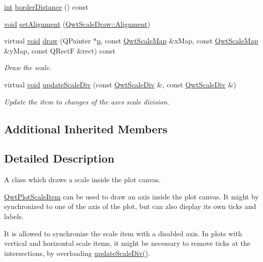 \begin{DoxyCompactItemize}
\hyperlink{ioapi_8h_a787fa3cf048117ba7123753c1e74fcd6}{int} \hyperlink{class_qwt_plot_scale_item_a3200035a9dd88e07f154ef4289a952c2}{border\-Distance} () const 
\item 
\hyperlink{group___u_a_v_objects_plugin_ga444cf2ff3f0ecbe028adce838d373f5c}{void} \hyperlink{class_qwt_plot_scale_item_af11343d14c4ee38e0527cedd52b3da85}{set\-Alignment} (\hyperlink{class_qwt_scale_draw_acd7ceeeac592ef08530788580b461c66}{Qwt\-Scale\-Draw\-::\-Alignment})
\item 
virtual \hyperlink{group___u_a_v_objects_plugin_ga444cf2ff3f0ecbe028adce838d373f5c}{void} \hyperlink{class_qwt_plot_scale_item_a2eef74cfd6007faf8b6e146277c82661}{draw} (Q\-Painter $\ast$\hyperlink{glext_8h_aa5367c14d90f462230c2611b81b41d23}{p}, const \hyperlink{class_qwt_scale_map}{Qwt\-Scale\-Map} \&x\-Map, const \hyperlink{class_qwt_scale_map}{Qwt\-Scale\-Map} \&y\-Map, const Q\-Rect\-F \&rect) const 
\begin{DoxyCompactList}\small\item\em Draw the scale. \end{DoxyCompactList}\item 
virtual \hyperlink{group___u_a_v_objects_plugin_ga444cf2ff3f0ecbe028adce838d373f5c}{void} \hyperlink{class_qwt_plot_scale_item_a9c32bac1ff73c6527305698792a6edfe}{update\-Scale\-Div} (const \hyperlink{class_qwt_scale_div}{Qwt\-Scale\-Div} \&, const \hyperlink{class_qwt_scale_div}{Qwt\-Scale\-Div} \&)
\begin{DoxyCompactList}\small\item\em Update the item to changes of the axes scale division. \end{DoxyCompactList}\end{DoxyCompactItemize}
\subsection*{Additional Inherited Members}


\subsection{Detailed Description}
A class which draws a scale inside the plot canvas. 

\hyperlink{class_qwt_plot_scale_item}{Qwt\-Plot\-Scale\-Item} can be used to draw an axis inside the plot canvas. It might by synchronized to one of the axis of the plot, but can also display its own ticks and labels.

It is allowed to synchronize the scale item with a disabled axis. In plots with vertical and horizontal scale items, it might be necessary to remove ticks at the intersections, by overloading \hyperlink{class_qwt_plot_scale_item_a9c32bac1ff73c6527305698792a6edfe}{update\-Scale\-Div()}.

